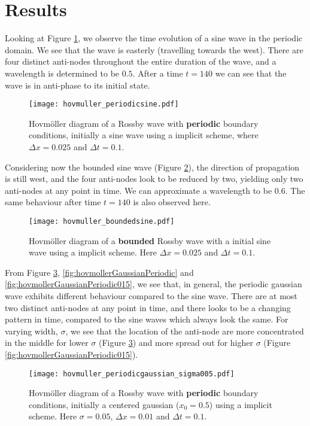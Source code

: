 \section{Results}
\label{sec:results}

Looking at Figure \ref{fig:hovmollerSinePeriodic}, we observe the time evolution of a sine wave in the periodic domain. We see that the wave is easterly (travelling towards the west). There are four distinct anti-nodes throughout the entire duration of the wave, and a wavelength is determined to be $0.5$. After a time $t=140$ we can see that the wave is in anti-phase to its initial state.
\begin{figure}[htbp]
	\centering
	\texttt{[image: hovmuller\_periodicsine.pdf]}
	\caption{Hovmöller diagram of a Rossby wave with \textbf{periodic} boundary conditions, initially a sine wave using a implicit scheme, where $\Delta x = 0.025$ and $\Delta t = 0.1$.}
	\label{fig:hovmollerSinePeriodic}
\end{figure}

Considering now the bounded sine wave (Figure \ref{fig:hovmollerSineBounded}), the direction of propagation is still west, and the four anti-nodes look to be reduced by two, yielding only two anti-nodes at any point in time. We can approximate a wavelength to be $0.6$. The same behaviour after time $t=140$ is also observed here.
\begin{figure}[htbp]
	\centering
	\texttt{[image: hovmuller\_boundedsine.pdf]}
	\caption{Hovmöller diagram of a \textbf{bounded} Rossby wave with a initial sine wave using a implicit scheme. Here $\Delta x = 0.025$ and $\Delta t = 0.1$.}
	\label{fig:hovmollerSineBounded}
\end{figure}

From Figure \ref{fig:hovmollerGaussianPeriodic005}, \ref{fig:hovmollerGaussianPeriodic} and \ref{fig:hovmollerGaussianPeriodic015}, we see that, in general, the periodic gaussian wave exhibits different behaviour compared to the sine wave. There are at most two distinct anti-nodes at any point in time, and there looks to be a changing pattern in time, compared to the sine waves which always look the same. For varying width, $\sigma$, we see that the location of the anti-node are more concentrated in the middle for lower $\sigma$ (Figure \ref{fig:hovmollerGaussianPeriodic005}) and more spread out for higher $\sigma$ (Figure \ref{fig:hovmollerGaussianPeriodic015}).
\begin{figure}[htbp]
	\centering
	\texttt{[image: hovmuller\_periodicgaussian\_sigma005.pdf]}
	\caption{Hovmöller diagram of a Rossby wave with \textbf{periodic} boundary conditions, initially a centered gaussian ($x_0=0.5$) using a implicit scheme. Here $\sigma = 0.05$, $\Delta x = 0.01$ and $\Delta t = 0.1$.}
	\label{fig:hovmollerGaussianPeriodic005}
\end{figure}

